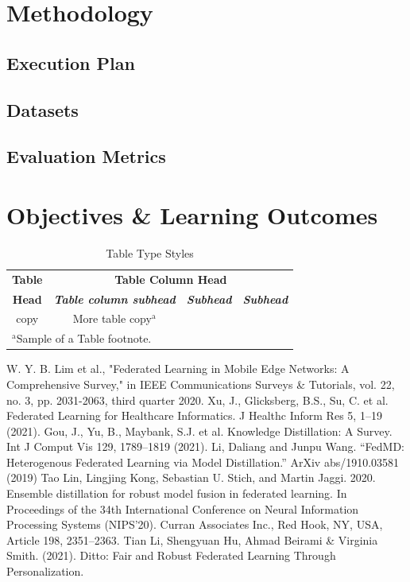 \documentclass[conference]{IEEEtran}
\begin{document}
\section{Methodology}
\subsection{Execution Plan}
\subsection{Datasets}
\subsection{Evaluation Metrics}

\section{Objectives \& Learning Outcomes}

\begin{table}[htbp]
\caption{Table Type Styles}
\begin{center}
\begin{tabular}{|c|c|c|c|}
\hline
\textbf{Table}&\multicolumn{3}{|c|}{\textbf{Table Column Head}} \\
\cline{2-4} 
\textbf{Head} & \textbf{\textit{Table column subhead}}& \textbf{\textit{Subhead}}& \textbf{\textit{Subhead}} \\
\hline
copy& More table copy$^{\mathrm{a}}$& &  \\
\hline
\multicolumn{4}{l}{$^{\mathrm{a}}$Sample of a Table footnote.}
\end{tabular}
\label{tab1}
\end{center}
\end{table}

\begin{thebibliography}{00}
 W. Y. B. Lim et al., "Federated Learning in Mobile Edge Networks: A Comprehensive Survey," in IEEE Communications Surveys \& Tutorials, vol. 22, no. 3, pp. 2031-2063, third quarter 2020.
 Xu, J., Glicksberg, B.S., Su, C. et al. Federated Learning for Healthcare Informatics. J Healthc Inform Res 5, 1–19 (2021).
 Gou, J., Yu, B., Maybank, S.J. et al. Knowledge Distillation: A Survey. Int J Comput Vis 129, 1789–1819 (2021).
 Li, Daliang and Junpu Wang. “FedMD: Heterogenous Federated Learning via Model Distillation.” ArXiv abs/1910.03581 (2019)
 Tao Lin, Lingjing Kong, Sebastian U. Stich, and Martin Jaggi. 2020. Ensemble distillation for robust model fusion in federated learning. In Proceedings of the 34th International Conference on Neural Information Processing Systems (NIPS'20). Curran Associates Inc., Red Hook, NY, USA, Article 198, 2351–2363.
 Tian Li, Shengyuan Hu, Ahmad Beirami \& Virginia Smith. (2021). Ditto: Fair and Robust Federated Learning Through Personalization. 
\end{thebibliography}
\end{document}
